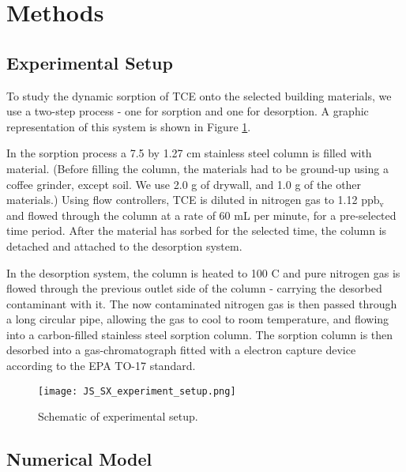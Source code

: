 \section{Methods}\label{sec:methods}

\subsection{Experimental Setup}\label{sec:experimental_method}

To study the dynamic sorption of TCE onto the selected building materials, we use a two-step process - one for sorption and one for desorption.
A graphic representation of this system is shown in Figure \ref{fig:js_sx_setup}.\par

In the sorption process a 7.5 by 1.27 cm stainless steel column is filled with material.
(Before filling the column, the materials had to be ground-up using a coffee grinder, except soil.
We use 2.0 g of drywall, and 1.0 g of the other materials.)
Using flow controllers, TCE is diluted in nitrogen gas to 1.12 $\mathrm{ppb_v}$ and flowed through the column at a rate of 60 mL per minute, for a pre-selected time period.
After the material has sorbed for the selected time, the column is detached and attached to the desorption system.\par

In the desorption system, the column is heated to 100 \degree C and pure nitrogen gas is flowed through the previous outlet side of the column - carrying the desorbed contaminant with it.
The now contaminated nitrogen gas is then passed through a long circular pipe, allowing the gas to cool to room temperature, and flowing into a carbon-filled stainless steel sorption column.
The sorption column is then desorbed into a gas-chromatograph fitted with a electron capture device according to the EPA TO-17 standard.\par

\begin{figure}
  \texttt{[image: JS\_SX\_experiment\_setup.png]}
  \caption{Schematic of experimental setup.} %
  \label{fig:js_sx_setup}
\end{figure}

\subsection{Numerical Model}\label{sec:model}

